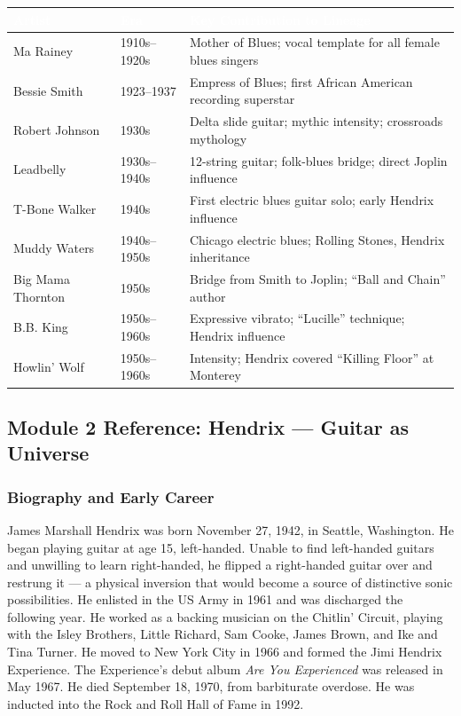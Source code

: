 \documentclass[11pt,letterpaper]{article}
\newcommand{\tableheader}[1]{\textbf{\sffamily\textcolor{white}{#1}}}
\begin{document}
\begin{center}
\begin{tabularx}{\textwidth}{L{3.5cm}C{2cm}X}
\toprule
{}
\tableheader{Artist} & \tableheader{Era} & \tableheader{Key Contribution to Lineage} \\
\midrule
Ma Rainey & 1910s--1920s & Mother of Blues; vocal template for all female blues singers \\
Bessie Smith & 1923--1937 & Empress of Blues; first African American recording superstar \\
Robert Johnson & 1930s & Delta slide guitar; mythic intensity; crossroads mythology \\
Leadbelly & 1930s--1940s & 12-string guitar; folk-blues bridge; direct Joplin influence \\
T-Bone Walker & 1940s & First electric blues guitar solo; early Hendrix influence \\
Muddy Waters & 1940s--1950s & Chicago electric blues; Rolling Stones, Hendrix inheritance \\
Big Mama Thornton & 1950s & Bridge from Smith to Joplin; ``Ball and Chain'' author \\
B.B. King & 1950s--1960s & Expressive vibrato; ``Lucille'' technique; Hendrix influence \\
Howlin' Wolf & 1950s--1960s & Intensity; Hendrix covered ``Killing Floor'' at Monterey \\
\bottomrule
\end{tabularx}
\end{center}

\subsection{Module 2 Reference: Hendrix --- Guitar as Universe}

\subsubsection{Biography and Early Career}

James Marshall Hendrix was born November 27, 1942, in Seattle, Washington. He began playing guitar at age 15, left-handed. Unable to find left-handed guitars and unwilling to learn right-handed, he flipped a right-handed guitar over and restrung it --- a physical inversion that would become a source of distinctive sonic possibilities. He enlisted in the US Army in 1961 and was discharged the following year. He worked as a backing musician on the Chitlin' Circuit, playing with the Isley Brothers, Little Richard, Sam Cooke, James Brown, and Ike and Tina Turner. He moved to New York City in 1966 and formed the Jimi Hendrix Experience. The Experience's debut album \textit{Are You Experienced} was released in May 1967. He died September 18, 1970, from barbiturate overdose. He was inducted into the Rock and Roll Hall of Fame in 1992.
\end{document}
